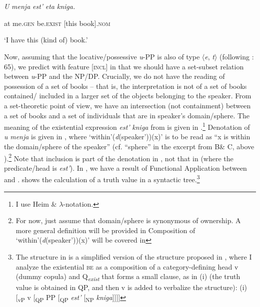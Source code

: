 \documentclass[output=paper,modfonts,nonflat]{langsci/langscibook}
\begin{document}
\ea%
    \label{ex:key:9}
    \gll\\
        \\
    \glt
    \z

          \textit{U} \textit{menja}     \textit{est’}           \textit{eta} \textit{kniga.}

  at me.\textsc{gen}   be.\textsc{exist}   [this book].\textsc{nom}

  ‘I have this (kind of) book.’

Now, assuming that the locative/possessive \textit{u}{}-PP is also of type ${\langle}$\textit{e}, \textit{t}${\rangle}$ (following \citealt{HeimKratzer1998}: 65), we predict with feature [\textsc{incl}] in  that we should have a set-subset relation between \textit{u}{}-PP and the NP/DP. Crucially, we do not have the reading of possession of a set of books – that is, the interpretation is not of a set of books contained/ included in a larger set of the objects belonging to the speaker. From a set-theoretic point of view, we have an intersection (not containment) between a set of books and a set of individuals that are in speaker’s domain/sphere. The meaning of the existential expression \textit{est’} \textit{kniga} from  is given in .\footnote{I use Heim \&  \textrm{${\lambda}$}{}-notation.} Denotation of \textit{u} \textit{menja} is given in , where ‘within'(\textit{d}(speaker'))(x)’ is to be read as “x is within the domain/sphere of the speaker” (cf. “sphere” in the excerpt from B\& C, above ).\footnote{For now, just assume that domain/sphere is synonymous of ownership. A more general definition will be provided in  Composition of ‘within\textrm{'}(\textit{d}(speaker\textrm{'}))(x)’ will be covered in }  Note that inclusion is part of the denotation in , not that in  (where the predicate/head is \textit{est’}). In , we have a result of Functional Application between  and .  shows the calculation of a truth value in a syntactic tree.\footnote{The structure in  is a simplified version of the structure proposed in \citet{Tsedryk2019}, where I analyze the existential \textsc{be} as a composition of a category-defining head v (dummy copula) and Q\textit{\textsubscript{exist}} that forms a small clause, as in (i) (the truth value is obtained in QP, and then v is added to verbalize the structure):   (i)  [\textsubscript{vP} v [\textsubscript{QP} PP [\textsubscript{QP} \textit{est’} [\textsubscript{NP} \textit{kniga}]]]]} 
\end{document}
